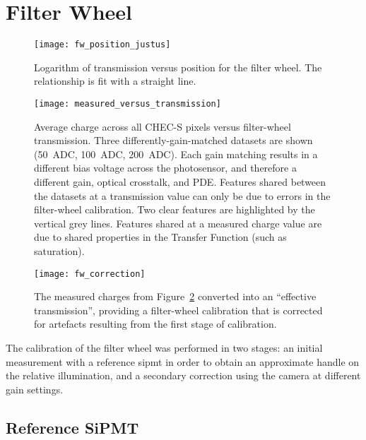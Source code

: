 \section{Filter Wheel}

\begin{figure}
	\centering
    \texttt{[image: fw\_position\_justus]} 
	\caption[Filter-wheel position calibration.]{Logarithm of transmission versus position for the filter wheel. The relationship is fit with a straight line.}
	\label{fig:fw_position}
\end{figure}

\begin{figure}
	\centering
    \texttt{[image: measured\_versus\_transmission]} 
	\caption[Measured charge versus transmission.]{Average charge across all CHEC-S pixels versus filter-wheel transmission. Three differently-gain-matched datasets are shown (50~ADC, 100~ADC, 200~ADC). Each gain matching results in a different bias voltage across the photosensor, and therefore a different gain, optical crosstalk, and PDE. Features shared between the datasets at a transmission value can only be due to errors in the filter-wheel calibration. Two clear features are highlighted by the vertical grey lines. Features shared at a measured charge value are due to shared properties in the Transfer Function (such as saturation).}
	\label{fig:measured_versus_transmission}
\end{figure}

\begin{figure}
	\centering
    \texttt{[image: fw\_correction]} 
	\caption[Secondary filter-wheel calibration.]{The measured charges from Figure~\ref{fig:measured_versus_transmission} converted into an ``effective transmission'', providing a filter-wheel calibration that is corrected for artefacts resulting from the first stage of calibration.}
	\label{fig:fw_correction}
\end{figure}

The calibration of the filter wheel was performed in two stages: an initial measurement with a reference \gls{sipmt} in order to obtain an approximate handle on the relative illumination, and a secondary correction using the camera at different gain settings.

\subsection{Reference SiPMT}

